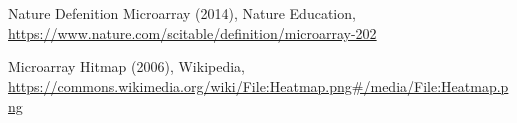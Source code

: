 \documentclass{article}
\begin{document}
\section{}

 

\newpage
\begin{thebibliography}{99}
	\begin{latin}
		Nature Defenition Microarray (2014), Nature Education, \url{https://www.nature.com/scitable/definition/microarray-202}
		
		Microarray Hitmap (2006), Wikipedia, \url{https://commons.wikimedia.org/wiki/File:Heatmap.png#/media/File:Heatmap.png}
		
	\end{latin}
\end{thebibliography}
\end{document}
